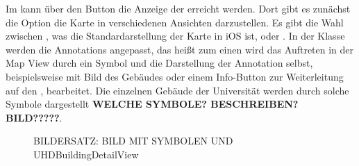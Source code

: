 \documentclass{report}
\begin{document}
Im  kann über den Button  die Anzeige der  erreicht werden. Dort gibt es zunächst die Option die Karte in verschiedenen Ansichten darzustellen. Es gibt die Wahl zwischen , was die Standardarstellung der Karte in iOS ist,  oder . In der Klasse  werden die Annotations angepasst, das heißt zum einen wird das Auftreten in der Map View durch ein Symbol und die Darstellung der Annotation selbst, beispielsweise mit Bild des Gebäudes oder einem Info-Button zur Weiterleitung auf den , bearbeitet. Die einzelnen Gebäude der Universität werden durch solche Symbole dargestellt \textbf{WELCHE SYMBOLE? BESCHREIBEN? BILD?????}. 

\begin{figure}[ht]\label{bild_3}
\centering {}
\caption{BILDERSATZ: BILD MIT SYMBOLEN UND UHDBuildingDetailView}
\end{figure}
\end{document}
